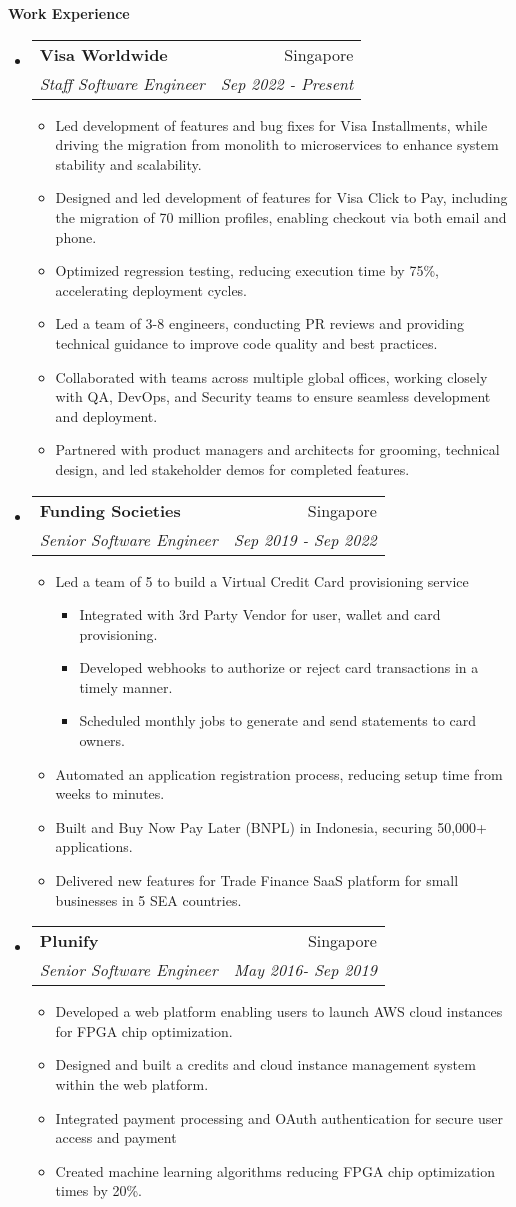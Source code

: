 \documentclass[letterpaper,11pt]{article}
\makeatletter
\newcommand{\resitem}[1]{\item #1 \vspace{-2pt}}
\newcommand{\resheading}[1]{{\large \colorbox{mygrey}{\begin{minipage}{\textwidth}{\textbf{#1 \vphantom{p\^{E}}}}\end{minipage}}}}
\newcommand{\ressubheading}[4]{
\begin{tabular*}{7.0in}{l@{\extracolsep{\fill}}r}
		\textbf{#1} & #2 \\
		\textit{#3} & \textit{#4} \\
\end{tabular*}\vspace{-6pt}}
\makeatother
\begin{document}
\resheading{Work Experience}
\begin{itemize}

\item
	\ressubheading{Visa Worldwide}{Singapore}{Staff Software Engineer}{Sep 2022 - Present}

	\begin{itemize}
		\resitem{Led development of features and bug fixes for Visa Installments, while driving the migration from monolith to microservices to enhance system stability and scalability.}
		\resitem{Designed and led development of features for Visa Click to Pay, including the migration of 70 million profiles, enabling checkout via both email and phone.}
		\resitem{Optimized regression testing, reducing execution time by 75\%, accelerating deployment cycles.}
		\resitem{Led a team of 3-8 engineers, conducting PR reviews and providing technical guidance to improve code quality and best practices.}
		\resitem{Collaborated with teams across multiple global offices, working closely with QA, DevOps, and Security teams to ensure seamless development and deployment.}
		\resitem{Partnered with product managers and architects for grooming, technical design, and led stakeholder demos for completed features.}
	\end{itemize}
	
\item
	\ressubheading{Funding Societies}{Singapore}{Senior Software Engineer}{Sep 2019 - Sep 2022}

	\begin{itemize}
		\resitem{Led a team of 5 to build a Virtual Credit Card provisioning service}
		 \begin{itemize}
			\resitem{Integrated with 3rd Party Vendor for user,  wallet and card provisioning.}
			\resitem{Developed webhooks to authorize or reject card transactions in a timely manner.}
			\resitem{Scheduled monthly jobs to generate and send statements to card owners.}
		\end{itemize}
		\resitem{Automated an application registration process,  reducing setup time from weeks to minutes.}
		\resitem{Built and  Buy Now Pay Later (BNPL) in Indonesia, securing 50,000+ applications.}
		\resitem{Delivered new features for Trade Finance SaaS platform for small businesses in 5 SEA countries.}
	\end{itemize}


\item
	\ressubheading{Plunify}{Singapore}{Senior Software Engineer}{May 2016- Sep 2019}
	\begin{itemize}
	    \resitem{Developed a web platform enabling users to launch AWS cloud instances for FPGA chip optimization.}
	    \resitem{Designed and built a credits and cloud instance management system within the web platform.}
	    \resitem{Integrated payment processing and OAuth authentication for secure user access and payment}
	   \resitem{Created machine learning algorithms reducing FPGA chip optimization times by 20\%.}
	\end{itemize}



\end{itemize}
\end{document}
